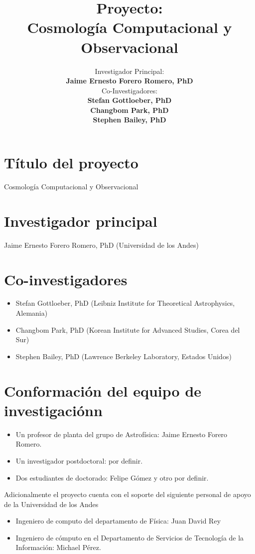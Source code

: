 \documentclass{article}
\title{Proyecto:\\{\bf Cosmolog\'ia Computacional y Observacional}}
\author{Investigador Principal:\\{\bf Jaime Ernesto Forero Romero,
    PhD}\\
  Co-Investigadores:\\
  {\bf Stefan Gottloeber, PhD}\\
  {\bf Changbom Park, PhD}\\
  {\bf Stephen Bailey, PhD}\\
}
\begin{document}
\maketitle
\tableofcontents 

\section{T\'itulo del proyecto}
Cosmolog\'ia Computacional y Observacional

\section{Investigador principal}
Jaime Ernesto Forero Romero, PhD (Universidad de los Andes)

\section{Co-investigadores}
\begin{itemize}
\item Stefan Gottloeber, PhD (Leibniz Institute for Theoretical
Astrophysics, Alemania)
\item Changbom Park, PhD (Korean Institute for Advanced Studies, Corea
  del Sur) 
\item Stephen Bailey, PhD (Lawrence Berkeley Laboratory, Estados
  Unidos) 
\end{itemize}

\section{Conformaci\'on del equipo de investigaci\'onn}
\begin{itemize}
\item Un profesor de planta del grupo de Astrof\'isica: Jaime Ernesto
  Forero Romero.
\item Un investigador postdoctoral: por definir.
\item Dos estudiantes de doctorado: Felipe G\'omez y otro por
  definir. 
\end{itemize}

Adicionalmente el proyecto cuenta con el soporte del siguiente personal de apoyo
de la Universidad de los Andes  
\begin{itemize}

\item{Ingeniero de computo del departamento de F\'isica:} Juan David Rey
\item{Ingeniero de c\'omputo en el Departamento de Servicios de
  Tecnolog\'ia de la Informaci\'on}: Michael P\'erez.
\end{itemize}
\end{document}
